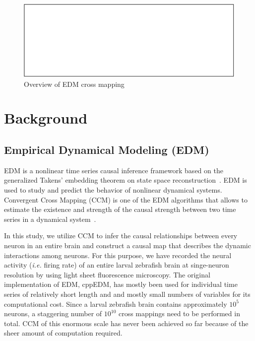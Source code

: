 \documentclass[conference]{IEEEtran}
\begin{document}
\begin{figure}
    \centering
    \includegraphics{figs/xmap_overview}
    \caption{Overview of EDM cross mapping}%
    \label{fig:edm}
\end{figure}

\section{Background}

\subsection{Empirical Dynamical Modeling (EDM)}\label{sec:edm}

EDM is a nonlinear time series causal inference framework based on the
generalized Takens' embedding theorem on state space
reconstruction~\cite{Deyle2011}. EDM is used to study and predict the behavior
of nonlinear dynamical systems. Convergent Cross Mapping (CCM) is one of the EDM
algorithms that allows to estimate the existence and strength of the causal
strength between two time series in a dynamical system~\cite{Sugihara2012}.

In this study, we utilize CCM to infer the causal relationships between every
neuron in an entire brain and construct a causal map that describes the dynamic
interactions among neurons. For this purpose, we have recorded the neural
activity (\emph{i.e.} firing rate) of an entire larval zebrafish brain at
singe-neuron resolution by using light sheet fluorescence microscopy. The
original implementation of EDM, cppEDM, has mostly been used for individual time
series of relatively short length and and mostly small numbers of variables for
its computational cost. Since a larval zebrafish brain contains approximately
$10^5$ neurons, a staggering number of $10^{10}$ cross mappings need to be
performed in total. CCM of this enormous scale has never been achieved so far
because of the sheer amount of computation required.
\end{document}
